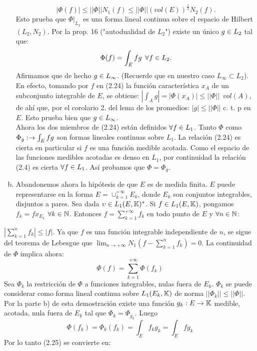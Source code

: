 \begin{enumerate}[a)]
$$
| \Phi (f) | \leq || \Phi || N_1 (f) \leq || \Phi || (vol(E))^\frac{1}{2}N_2(f).
$$
Esto prueba que $\Phi |_{L_2}$ es una forma lineal continua sobre el espacio de Hilbert $(L_2, N_2)$. Por la prop. 16 ("autodualidad de $L_2$") existe un único $g \in L_2$ tal que: 
\begin{equation}
\Phi (f)=\int_E fg \phantom{s} \forall f \in L_2.
\end{equation} 
Afirmamos que de hecho $g \in L_\infty$. (Recuerde que en nuestro caso $L_\infty \subset L_2$). \\
En efecto, tomando por $f$ en (2.24) la función característica $x_A$ de un subconjunto integrable de $E$, se obtiene:
 $|\int_A g |=|\Phi (x_A)| \leq || \Phi || \phantom{s} vol(A)$, de ahí que, por el corolario 2. del lema de los promedios: $|g| \leq || \Phi ||$ c. t. p en $E$. Esto prueba bien que $g 
 \in L_\infty$. \\
 Ahora los dos miembros de (2.24) están definidos $\forall f \in L_1$. Tanto $\Phi$ como $\Phi_g:\rightarrow \int_E fg$ son formas lineales continuas sobre $L_1$. La relación (2.24) es cierta en particular si $f$ es una función medible acotada. Como el espacio de las funciones medibles acotadas es denso en $L_1$, por continuidad la relación (2.4) es cierta $\forall f \in L_1$. Así probamos que $\Phi=\Phi_g$. 
 \item Abandonemos ahora la hipótesis de que $E$ es de medida finita. $E$ puede representarse en la forma $E=\cup_{k=1}^{+\infty}E_k$, donde $E_k$ son conjuntos integrables, disjuntos a pares. Sea dada $\upsilon \in L_1(E,\mathbb{K})^*$. Si $f \in L_1 (E,\mathbb{K})$, pongamos $f_k=fx_{E_k}$ $\forall k \in \mathbb{N}$. Entonces $f=\sum_{k=1}^{+\infty}f_k$ en todo punto de $E$ y $\forall n\in \mathbb{N}$:
\end{enumerate}
 $| \sum_{k=1}^n f_k | \leq |f|$. Ya que $f$ es una función integrable independiente de $n$, se sigue del teorema de Lebesgue que $\lim_{n \to +\infty} N_1 (f-\sum_{k=1}^n f_k)=0$. La continuidad de $\Phi$ implica ahora:
 \begin{equation}
 \Phi (f)=\sum_{k=1}^{+\infty}\Phi (f_k)
 \end{equation}
 Sea $\Phi_k$ la restricción de $\Phi$ a funciones integrables, nulas fuera de $E_k$. $\Phi_k$ se puede considerar como forma lineal continua sobre $L_1 (E_k,\mathbb{K})$ de norma $|| \Phi_k || \leq || \Phi ||$. Por la parte b) de esta demostración existe una función $g_k: E \rightarrow \mathbb{K}$ medible, acotada, nula fuera de $E_k$ tal que $\Phi_k=\Phi_{g_k}$. Luego
 $$
 \Phi (f_k)=\Phi_k (f_k) = \int_E f_k g_k=\int_E fg_k
 $$
 Por lo tanto (2.25) se convierte en:
 
